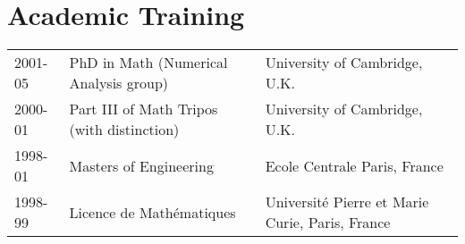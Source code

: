 \documentclass[11pt]{article}
\begin{document}
 



\section{Academic Training}
\begin{tabular}{lll}
2001-05 & PhD in Math (Numerical Analysis group) & University of Cambridge, U.K.\\
2000-01 & Part III of Math Tripos (with distinction) & University of Cambridge, U.K.\\
1998-01 & Masters of Engineering & Ecole Centrale Paris, France\\   
1998-99 & Licence de Math\'{e}matiques & Universit\'{e} Pierre et Marie Curie,  Paris, France\\
\end{tabular}  
\end{document}
